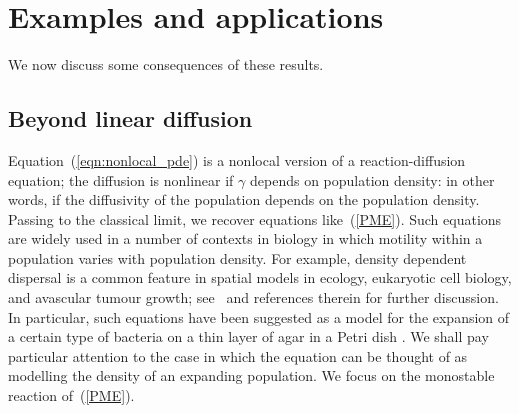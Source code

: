 \documentclass[EJP]{ejpecp} %
\newcommand{\citep}[1]{\cite{#1}}
\begin{document}
\section{Examples and applications}
\label{sec:applications}

We now discuss some consequences of these results.

\subsection{Beyond linear diffusion}
\label{beyond linear diffusion}

Equation~(\ref{eqn:nonlocal_pde}) is a nonlocal version of a reaction-diffusion equation;
the diffusion is nonlinear if $\gamma$ depends on population density:
in other words, if the diffusivity of the population depends on the population density.
Passing to the classical limit, we recover equations like~(\ref{PME}).
Such equations are widely used in a number of contexts in biology in which
motility within a population varies with population density.
For example, density dependent dispersal is a common feature in spatial
models in ecology, eukaryotic cell biology, and avascular tumour growth;
see~\cite{sherratt:2010} and references therein for further discussion. 
In particular, such equations have been suggested as a model for
the expansion of a certain type of bacteria %
on a thin layer of agar in a Petri dish 
\citep{cohen/golding/kozlovsky/benjacob/ron:1999}. 
We shall pay particular attention to the case in which the equation can be 
thought of as modelling the density of an expanding population. 
We focus on the monostable reaction of~(\ref{PME}).
\end{document}
